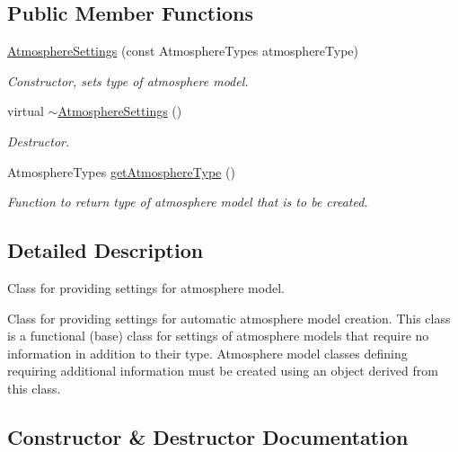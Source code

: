 \subsection*{Public Member Functions}
\begin{DoxyCompactItemize}
\item 
\hyperlink{classtudat_1_1simulation__setup_1_1AtmosphereSettings_a82760111a1975705c2bd939836e8486a}{Atmosphere\+Settings} (const Atmosphere\+Types atmosphere\+Type)
\begin{DoxyCompactList}\small\item\em Constructor, sets type of atmosphere model. \end{DoxyCompactList}\item 
virtual \hyperlink{classtudat_1_1simulation__setup_1_1AtmosphereSettings_a5d315b52924a7f82d4e269402c60a51c}{$\sim$\+Atmosphere\+Settings} ()\hypertarget{classtudat_1_1simulation__setup_1_1AtmosphereSettings_a5d315b52924a7f82d4e269402c60a51c}{}\label{classtudat_1_1simulation__setup_1_1AtmosphereSettings_a5d315b52924a7f82d4e269402c60a51c}

\begin{DoxyCompactList}\small\item\em Destructor. \end{DoxyCompactList}\item 
Atmosphere\+Types \hyperlink{classtudat_1_1simulation__setup_1_1AtmosphereSettings_aec4287b357a3bb6abc189f7c27474531}{get\+Atmosphere\+Type} ()
\begin{DoxyCompactList}\small\item\em Function to return type of atmosphere model that is to be created. \end{DoxyCompactList}\end{DoxyCompactItemize}


\subsection{Detailed Description}
Class for providing settings for atmosphere model. 

Class for providing settings for automatic atmosphere model creation. This class is a functional (base) class for settings of atmosphere models that require no information in addition to their type. Atmosphere model classes defining requiring additional information must be created using an object derived from this class. 

\subsection{Constructor \& Destructor Documentation}

